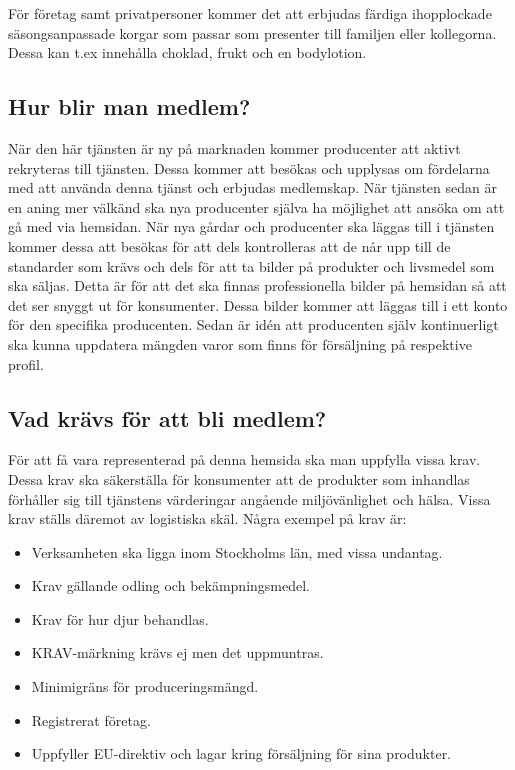 \documentclass[10pt,a4paper,oneside]{article}
\begin{document}
För företag samt privatpersoner kommer det att erbjudas färdiga ihopplockade säsongsanpassade korgar som passar som presenter till familjen eller kollegorna. Dessa kan t.ex innehålla choklad, frukt och en bodylotion.  

\subsection{Hur blir man medlem?}
När den här tjänsten är ny på marknaden kommer producenter att aktivt rekryteras till tjänsten. Dessa kommer att besökas och upplysas om fördelarna med att använda denna tjänst och erbjudas medlemskap. När tjänsten sedan är en aning mer välkänd ska nya producenter själva ha möjlighet att ansöka om att gå med via hemsidan. När nya gårdar och producenter ska läggas till i tjänsten kommer dessa att besökas för att dels kontrolleras att de når upp till de standarder som krävs och dels för att ta bilder på produkter och livsmedel som ska säljas. Detta är för att det ska finnas professionella bilder på hemsidan så att det ser snyggt ut för konsumenter. Dessa bilder kommer att läggas till i ett konto för den specifika producenten. Sedan är idén att producenten själv kontinuerligt ska kunna uppdatera mängden varor som finns för försäljning på respektive profil.  

\subsection{Vad krävs för att bli medlem?}
För att få vara representerad på denna hemsida ska man uppfylla vissa krav. Dessa krav ska säkerställa för konsumenter att de produkter som inhandlas förhåller sig till tjänstens värderingar angående miljövänlighet och hälsa. Vissa krav ställs däremot av logistiska skäl. Några exempel på krav är:  

\begin{itemize}
\item Verksamheten ska ligga inom Stockholms län, med vissa undantag. 
\item Krav gällande odling och bekämpningsmedel.
\item Krav för hur djur behandlas. 
\item KRAV-märkning krävs ej men det uppmuntras.  
\item Minimigräns för produceringsmängd. 
\item Registrerat företag.
\item Uppfyller EU-direktiv och lagar kring försäljning för sina produkter.
\end{itemize}
\end{document}
